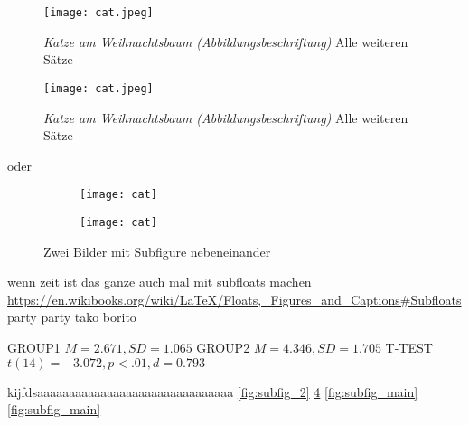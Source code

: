 \begin{figure}[htb]
  \begin{minipage}[t]{0.45\linewidth}
    \centering
      \texttt{[image: cat.jpeg]} 
      \caption[Katze am Weihnachtsbaum (das steht im abbverzeichnis)]{
        \textit{Katze am Weihnachtsbaum (Abbildungsbeschriftung)}
        Alle weiteren Sätze
        }
      \label{fig:cat4}
  \end{minipage}
  \hspace{0.05\linewidth}
  \begin{minipage}[t]{0.45\linewidth}
    \centering
      \texttt{[image: cat.jpeg]} 
      \caption[Katze am Weihnachtsbaum (das steht im abbverzeichnis)]{
        \textit{Katze am Weihnachtsbaum (Abbildungsbeschriftung)}
        Alle weiteren Sätze
        }
      \label{fig:cat5}
  \end{minipage}
% 
% 
\end{figure}


oder



\begin{figure}
  \label{fig:subfig_main}
  \begin{subfigure}[c]{0.45\linewidth}
    \label{fig:subfig_1}
    \texttt{[image: cat]}
  \end{subfigure}
  \begin{subfigure}[c]{0.45\linewidth}
    \label{fig:subfig_2}
    \texttt{[image: cat]}
  \end{subfigure}
  \caption{Zwei Bilder mit Subfigure nebeneinander}
\end{figure}




wenn zeit ist das ganze auch mal mit subfloats machen 
\url{https://en.wikibooks.org/wiki/LaTeX/Floats,_Figures_and_Captions#Subfloats}{party party tako borito}

GROUP1 $ M=2.671, SD=1.065 $
GROUP2 $ M=4.346, SD=1.705 $
T-TEST $ t(14)=-3.072,p<.01,d=0.793 $


kijfdsaaaaaaaaaaaaaaaaaaaaaaaaaaaaaaa \autoref{fig:subfig_2} \ref{fig:subfig_2} \autoref{fig:subfig_main} \ref{fig:subfig_main}